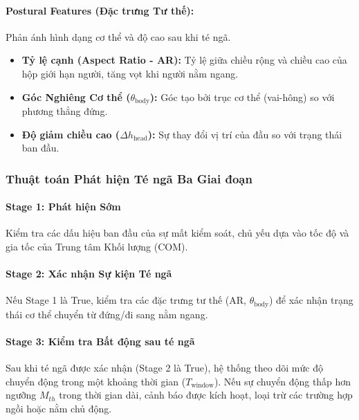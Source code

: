 \paragraph{Postural Features (Đặc trưng Tư thế):} Phản ánh hình dạng cơ thể và độ cao sau khi té ngã.
\begin{itemize}
    \item \textbf{Tỷ lệ cạnh (Aspect Ratio - AR):} Tỷ lệ giữa chiều rộng và chiều cao của hộp giới hạn người, tăng vọt khi người nằm ngang.
    \item \textbf{Góc Nghiêng Cơ thể ($\theta_{\text{body}}$):} Góc tạo bởi trục cơ thể (vai-hông) so với phương thẳng đứng.
    \item \textbf{Độ giảm chiều cao ($\Delta h_{\text{head}}$):} Sự thay đổi vị trí của đầu so với trạng thái ban đầu.
\end{itemize}

\subsubsection{Thuật toán Phát hiện Té ngã Ba Giai đoạn}

\paragraph{Stage 1: Phát hiện Sớm}
Kiểm tra các dấu hiệu ban đầu của sự mất kiểm soát, chủ yếu dựa vào tốc độ và gia tốc của Trung tâm Khối lượng (COM).

\paragraph{Stage 2: Xác nhận Sự kiện Té ngã}
Nếu Stage 1 là True, kiểm tra các đặc trưng tư thế (AR, $\theta_{\text{body}}$) để xác nhận trạng thái cơ thể chuyển từ đứng/đi sang nằm ngang.

\paragraph{Stage 3: Kiểm tra Bất động sau té ngã}
Sau khi té ngã được xác nhận (Stage 2 là True), hệ thống theo dõi mức độ chuyển động trong một khoảng thời gian ($T_{\text{window}}$). Nếu sự chuyển động thấp hơn ngưỡng $M_{th}$ trong thời gian dài, cảnh báo được kích hoạt, loại trừ các trường hợp ngồi hoặc nằm chủ động.


